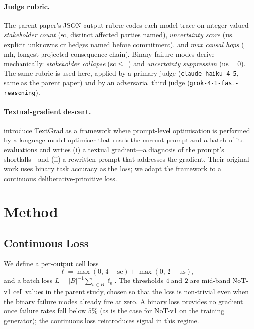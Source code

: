 \documentclass[11pt]{article}
\begin{document}
\paragraph{Judge rubric.}
The parent paper's JSON-output rubric codes each model trace on integer-valued \emph{stakeholder count} ($\text{sc}$, distinct affected parties named), \emph{uncertainty score} ($\text{us}$, explicit unknowns or hedges named before commitment), and \emph{max causal hops} ($\text{mh}$, longest projected consequence chain).
Binary failure modes derive mechanically: \emph{stakeholder collapse} ($\text{sc} \leq 1$) and \emph{uncertainty suppression} ($\text{us} = 0$).
The same rubric is used here, applied by a primary judge (\texttt{claude-haiku-4-5}, same as the parent paper) and by an adversarial third judge (\texttt{grok-4-1-fast-reasoning}).

\paragraph{Textual-gradient descent.}
\citet{yuksekgonul2024textgrad} introduce TextGrad as a framework where prompt-level optimisation is performed by a language-model optimiser that reads the current prompt and a batch of its evaluations and writes (i) a textual gradient---a diagnosis of the prompt's shortfalls---and (ii) a rewritten prompt that addresses the gradient.
Their original work uses binary task accuracy as the loss; we adapt the framework to a continuous deliberative-primitive loss.

\section{Method}
\label{sec:method}

\subsection{Continuous Loss}

We define a per-output cell loss
\begin{equation}
  \ell = \max(0,\, 4 - \text{sc}) + \max(0,\, 2 - \text{us}),
  \label{eq:loss}
\end{equation}
and a batch loss $L = |B|^{-1} \sum_{b \in B} \ell_b$.
The thresholds $4$ and $2$ are mid-band NoT-v1 cell values in the parent study, chosen so that the loss is non-trivial even when the binary failure modes already fire at zero.
A binary loss provides no gradient once failure rates fall below $5\%$ (as is the case for NoT-v1 on the training generator); the continuous loss reintroduces signal in this regime.
\end{document}
